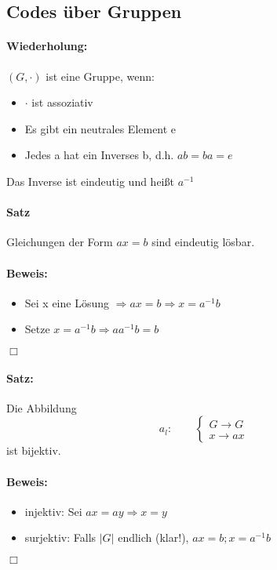\subsection{Codes über Gruppen}
\paragraph{Wiederholung:}
$(G,\cdot)$ ist eine Gruppe, wenn:
\begin{itemize}
\item $\cdot$ ist assoziativ
\item Es gibt ein neutrales Element e
\item Jedes a hat ein Inverses b, d.h. $ab=ba=e$
\end{itemize}
Das Inverse ist eindeutig und heißt $a^{-1}$

\paragraph{Satz}
Gleichungen der Form $ax = b$ sind eindeutig lösbar.

\paragraph{Beweis:}
\begin{itemize}
\item Sei x eine Lösung $\Rightarrow a x = b \Rightarrow x = a^{-1} b$
\item Setze $x = a^{-1} b \Rightarrow a a^{-1} b = b$
\end{itemize}
$\Box$

\paragraph{Satz:} 
Die Abbildung 
\begin{equation*}
 a_l:\qquad	
 \left\{
 \begin{aligned}
	G \rightarrow G\\
	x \rightarrow ax
	\end{aligned}
	\right.
\end{equation*}
ist bijektiv. 

\paragraph{Beweis:}
\begin{itemize}
\item injektiv: Sei $ax=ay \Rightarrow x=y$
\item surjektiv: Falls $\vert G \vert$ endlich (klar!), $ax = b; x = a^{-1} b$
\end{itemize}
$\Box$

